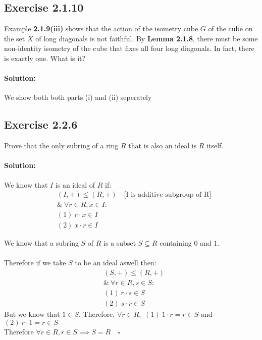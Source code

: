 \documentclass{article}
\begin{document}
\subsection*{Exercise 2.1.10}
Example \textbf{2.1.9(iii)} shows that the action of the isometry
cube $G$ of the cube on the set $X$ of long diagonals is not faithful.
By \textbf{Lemma 2.1.8}, there must be some non-identity isometry of the
cube that fixes all four long diagonals. In fact, there is exactly one.
What is it?

\paragraph{Solution:} We show both both parts (i) and (ii) seperately


\subsection*{Exercise 2.2.6}
Prove that the only subring of a ring $R$ that is also an
ideal is $R$ itself.

\paragraph{Solution:} We know that $I$ is an ideal of $R$ if:\\
    \begin{equation*}
        \begin{aligned}
            &(I, +) \le (R, +)\quad  \text{[I is additive subgroup of R]}\\
            & \&\ \forall r \in R, x \in I:\\
            & (1)\ r \cdot x \in I\\
            & (2)\ x \cdot r \in I
        \end{aligned}
    \end{equation*}

    We know that a subring $S$ of $R$ is a subset $S \subseteq R$ containing $0$ and $1$.\\
    \\Therefore if we take $S$ to be an ideal aswell then:
    \begin{equation*}
        \begin{aligned}
            &(S, +) \le (R, +)\\
            & \&\ \forall r \in R, s \in S:\\
            & (1)\ r \cdot s \in S\\
            & (2)\ s \cdot r \in S
        \end{aligned}
    \end{equation*}
    But we know that $1 \in S$. Therefore, $\forall r \in R,$ $(1)\ 1 \cdot r = r \in S$ and $(2)\ r \cdot 1 = r \in S$\\
    Therefore $\forall r \in R, r \in S \implies S = R \quad \square$
\end{document}

